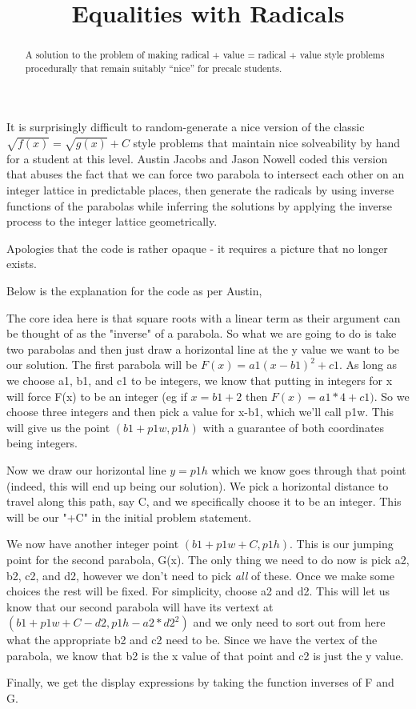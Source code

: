 \documentclass{ximera}
\title{Equalities with Radicals}
\begin{document}
\begin{abstract}
A solution to the problem of making radical + value = radical + value style problems procedurally that remain suitably ``nice'' for precalc students.
\end{abstract}
\maketitle

It is surprisingly difficult to random-generate a nice version of the classic $\sqrt{f(x)} = \sqrt{g(x)} + C$ style problems that maintain nice solveability by hand for a student at this level. Austin Jacobs and Jason Nowell coded this version that abuses the fact that we can force two parabola to intersect each other on an integer lattice in predictable places, then generate the radicals by using inverse functions of the parabolas while inferring the solutions by applying the inverse process to the integer lattice geometrically.

Apologies that the code is rather opaque - it requires a picture that no longer exists.


Below is the explanation for the code as per Austin,

\begin{explanation}
    
    The core idea here is that square roots with a linear term as their argument can be thought of as the "inverse" of a parabola.  So what we are going to do is take two parabolas and then just draw a horizontal line at the y value we want to be our solution.  The first parabola will be $F(x)=a1(x-b1)^2+c1$.  As long as we choose a1, b1, and c1 to be integers, we know that putting in integers for x will force F(x) to be an integer (eg if $x=b1+2$ then $F(x)=a1*4+c1)$.  So we choose three integers and then pick a value for x-b1, which we'll call p1w.  This will give us the point $(b1+p1w, p1h)$ with a guarantee of both coordinates being integers.  
    
    Now we draw our horizontal line $y=p1h$ which we know goes through that point (indeed, this will end up being our solution).  We pick a horizontal distance to travel along this path, say C, and we specifically choose it to be an integer.  This will be our "+C" in the initial problem statement. 
    
    We now have another integer point $(b1+p1w+C,p1h)$.  This is our jumping point for the second parabola, G(x).  The only thing we need to do now is pick a2, b2, c2, and d2, however we don't need to pick \textit{all} of these.  Once we make some choices the rest will be fixed.  For simplicity, choose a2 and d2.  This will let us know that our second parabola will have its vertext at $(b1+p1w+C-d2, p1h-a2*d2^2)$ and we only need to sort out from here what the appropriate b2 and c2 need to be.
    Since we have the vertex of the parabola, we know that b2 is the x value of that point and c2 is just the y value.
    
    Finally, we get the display expressions by taking the function inverses of  F and G.

\end{explanation}
\end{document}
